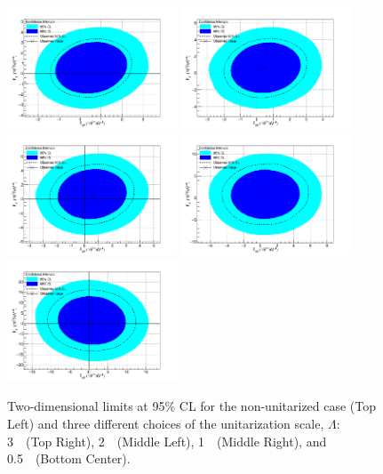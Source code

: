 \begin{figure}[htp]
\centering
\includegraphics[width=0.45\textwidth]{figures/aQGC/lll-Un-Unit.png}
\includegraphics[width=0.45\textwidth]{figures/aQGC/lll-3000.png}
\includegraphics[width=0.45\textwidth]{figures/aQGC/lll-2000.png}
\includegraphics[width=0.45\textwidth]{figures/aQGC/lll-1000.png}
\includegraphics[width=0.45\textwidth]{figures/aQGC/lll-500.png}
\caption{Two-dimensional limits at 95\% CL for the non-unitarized case (Top Left)
and three different choices of the unitarization scale, $\Lambda$:
3~\TeV~(Top Right), 2~\TeV~(Middle Left), 1~\TeV~(Middle Right), and 0.5~\TeV~(Bottom Center).}
\label{fig:WWW2D}
\end{figure}  


  

  

  
